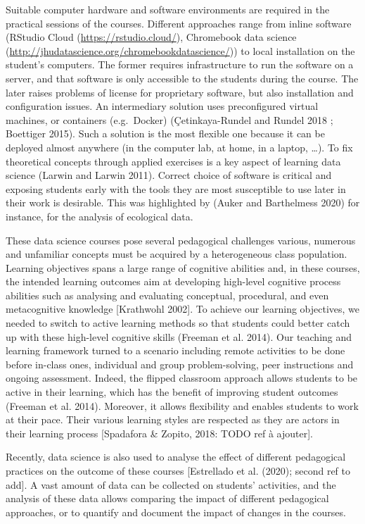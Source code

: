 \documentclass[
]{article}
\begin{document}
Suitable computer hardware and software environments are required in the
practical sessions of the courses. Different approaches range from
inline software (RStudio Cloud (\url{https://rstudio.cloud/}),
Chromebook data science
(\url{http://jhudatascience.org/chromebookdatascience/})) to local
installation on the student's computers. The former requires
infrastructure to run the software on a server, and that software is
only accessible to the students during the course. The later raises
problems of license for proprietary software, but also installation and
configuration issues. An intermediary solution uses preconfigured
virtual machines, or containers (e.g.~Docker) (Çetinkaya-Rundel and
Rundel 2018 ; Boettiger 2015). Such a solution is the most flexible one
because it can be deployed almost anywhere (in the computer lab, at
home, in a laptop, \ldots). To fix theoretical concepts through applied
exercises is a key aspect of learning data science (Larwin and Larwin
2011). Correct choice of software is critical and exposing students
early with the tools they are most susceptible to use later in their
work is desirable. This was highlighted by (Auker and Barthelmess 2020)
for instance, for the analysis of ecological data.

These data science courses pose several pedagogical challenges various,
numerous and unfamiliar concepts must be acquired by a heterogeneous
class population. Learning objectives spans a large range of cognitive
abilities and, in these courses, the intended learning outcomes aim at
developing high-level cognitive process abilities such as analysing and
evaluating conceptual, procedural, and even metacognitive knowledge
{[}Krathwohl 2002{]}. To achieve our learning objectives, we needed to
switch to active learning methods so that students could better catch up
with these high-level cognitive skills (Freeman et al. 2014). Our
teaching and learning framework turned to a scenario including remote
activities to be done before in-class ones, individual and group
problem-solving, peer instructions and ongoing assessment. Indeed, the
flipped classroom approach allows students to be active in their
learning, which has the benefit of improving student outcomes (Freeman
et al. 2014). Moreover, it allows flexibility and enables students to
work at their pace. Their various learning styles are respected as they
are actors in their learning process {[}Spadafora \& Zopito, 2018: TODO
ref à ajouter{]}.

Recently, data science is also used to analyse the effect of different
pedagogical practices on the outcome of these courses {[}Estrellado et
al. (2020); second ref to add{]}. A vast amount of data can be collected
on students' activities, and the analysis of these data allows comparing
the impact of different pedagogical approaches, or to quantify and
document the impact of changes in the courses.
\end{document}
